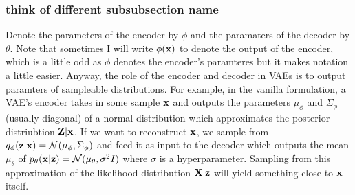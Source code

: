 \documentclass[11pt]{article}
\begin{document}
\subsubsection{think of different subsubsection name}
Denote the parameters of the encoder by $\phi$ and the paramaters of the decoder by $\theta$. Note that sometimes I will write $\phi(\mathbf{x})$ to denote the output of the encoder, which is a little odd as $\phi$ denotes the encoder's paramteres but it makes notation a little easier. Anyway, the role of the encoder and decoder in VAEs is to output paramters of sampleable distributions. For example, in the vanilla formulation, a VAE's encoder takes in some sample $\mathbf{x}$ and outputs the parameters $\mu_{\phi}$ and $\Sigma_{\phi}$ (usually diagonal) of a normal distribution which approximates the posterior distriubtion $\mathbf{Z}|\mathbf{x}$. If we want to reconstruct $\mathbf{x}$, we sample from $q_{\phi}(\mathbf{z}|\mathbf{x})=\mathcal{N}(\mu_{\phi}, \Sigma_{\phi})$ and feed it as input to the decoder which outputs the mean $\mu_{\theta}$ of $p_{\theta}(\mathbf{x}|\mathbf{z})=\mathcal{N}(\mu_{\theta},\sigma^2 I)$ where $\sigma$ is a hyperparameter. Sampling from this approximation of the likelihood distribution $\mathbf{X}|\mathbf{z}$ will yield something close to $\mathbf{x}$ itself.
\end{document}
